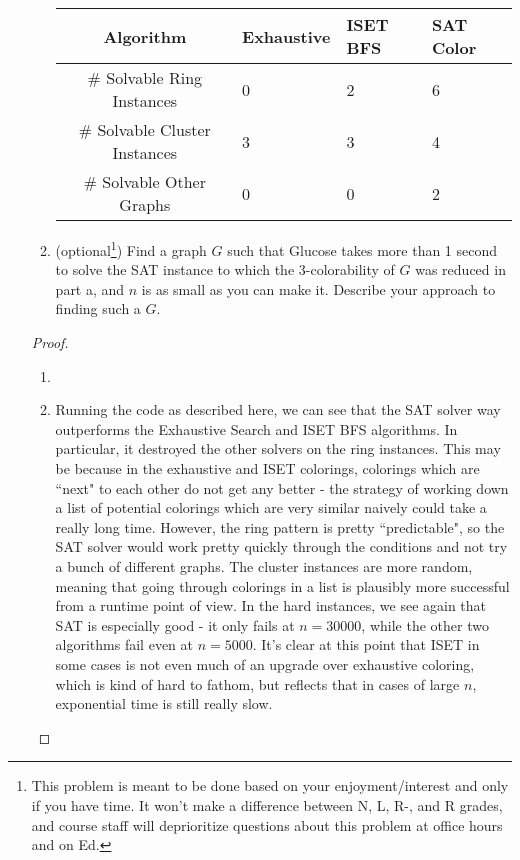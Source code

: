 \documentclass[11pt]{article}
\begin{document}
\begin{enumerate}
\begin{enumerate}
\begin{center}
    \begin{tabular}{|c|l|l|l|}
    \hline 
    Algorithm
    & \multicolumn{1}{|p{2cm}|}{Exhaustive}
    & \multicolumn{1}{|p{2cm}|}{ISET BFS}
    & \multicolumn{1}{|p{2cm}|}{SAT Color}\\\hline
    \hline
        \# Solvable Ring Instances & 0  & 2  & 6 \\
        \# Solvable Cluster Instances  & 3  & 3 & 4 \\
        \# Solvable Other Graphs  & 0 & 0 & 2  \\
        \hline
    \end{tabular}
\end{center}

    \item (optional\footnote{This problem is meant to be done based on your enjoyment/interest and only if you have time. It won't make a difference between N, L, R-, and R grades, and course staff will deprioritize questions about this problem at office hours and on Ed.}) Find a graph $G$ such that Glucose takes more than 1 second to solve the SAT instance to which the 3-colorability of $G$ was reduced in part a, and $n$ is as small as you can make it. Describe your approach to finding such a $G$. 
  \end{enumerate}
  
  
\begin{proof}
\begin{enumerate}

\item 

\item Running the code as described here, we can see that the SAT solver way outperforms the Exhaustive Search and ISET BFS algorithms. In particular, it destroyed the other solvers on the ring instances. This may be because in the exhaustive and ISET colorings, colorings which are ``next" to each other do not get any better - the strategy of working down a list of potential colorings which are very similar naively could take a really long time. However, the ring pattern is pretty ``predictable", so the SAT solver would work pretty quickly through the conditions and not try a bunch of different graphs. The cluster instances are more random, meaning that going through colorings in a list is plausibly more successful from a runtime point of view. In the hard instances, we see again that SAT is especially good - it only fails at $n = 30000$, while the other two algorithms fail even at $n = 5000$. It's clear at this point that ISET in some cases is not even much of an upgrade over exhaustive coloring, which is kind of hard to fathom, but reflects that in cases of large $n$, exponential time is still really slow.


\end{enumerate}
\end{proof}
\end{enumerate}
\end{document}
